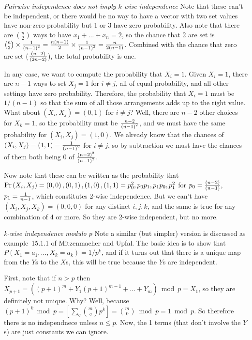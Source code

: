  {\it Pairwise independence does not imply $k$-wise independence}\hfil\break
Note that these can't be independent, or there would be no way to have a vector
with two set values have non-zero probability but 1 or 3 have zero probability.
Also note that there are $n \choose 2$ ways to have $x_1 + \ldots + x_n = 2$,
so the chance that 2 are set is ${n \choose 2} \times {1 \over \left(n - 1\right)^2} =
{n \left(n - 1\right) \over 2} \times {1 \over \left(n - 1\right)^2} = {n \over 2 \left(n - 1\right)}$.
Combined with the chance that zero are set ($\left(n - 2\right) \over \left(2 n - 2\right)$),
the total probability is one.

In any case, we want to compute the probability that $X_i = 1$.  Given $X_i = 1$, there are $n - 1$
ways to set $X_j = 1$ for $i \neq j$, all of equal probability, and all other settings have zero probability.
Therefore, the probability that $X_i = 1$ must be $1 / \left(n - 1\right)$ so that the sum of
all those arrangements adds up to the right value.  What about $\left(X_i, X_j\right) = \left(0, 1\right)$ 
for $i \neq j$? Well, there are $n-2$ other choices for $X_k = 1$, so the probability
must be $n - 2 \over \left(n - 1\right)^2$, and we must have the same probability
for $\left(X_i, X_j\right) = \left(1, 0\right)$.  We already know that the chances of
$\left(X_i, X_j\right) = \left(1, 1\right) = {1 \over \left(n - 1\right)^2}$ for $i \neq j$,
so by subtraction we must have the chances of them both being 0 of
$\left(n - 2\right)^2 \over \left(n - 1\right)^2$.

Now note that these can be written as the probability that ${\rm Pr} \left(X_i, X_j\right) = 
\left(0, 0\right), \left(0, 1\right), \left(1, 0\right), \left(1, 1\right) =
p_0^2, p_0 p_1, p_1 p_0, p_1^2$ for $p_0 = {\left( n - 2\right) \over \left(n - 1\right)}$,
$p_1 = {1 \over n - 1}$, which constitutes 2-wise independence.
But we can't have $\left(X_i, X_j, X_k\right) = \left(0, 0, 0\right)$ for any distinct
$i, j, k$, and the same is true for any combination of 4 or more.  So they are 2-wise
independent, but no more.

 {\it k-wise independence modulo $p$}\hfil\break
Note a similar (but simpler) version is discussed as example~15.1.1 of Mitzenmacher and Upfal.
The basic idea is to show that $P\left(X_1 = a_1, \dots, X_k = a_k\right) = 1 / p^k$, and if it turns
out that there is a unique map from the $Y$s to the $X$s, this will be true because the $Y$s are
independent.

First, note that if $n > p$ then $X_{p+1} = \left( \left(p+1\right)^m + Y_1 \left(p+1\right)^{m-1}
 + \ldots + Y_m\right) \bmod p =X_1$, so they are definitely not unique.  Why?  Well, because
 $\left(p + 1\right)^k \bmod p = \left[ \sum_q {m \choose q} p^k  \right] = {m \choose 0} \bmod p = 
 1 \bmod p$.  So therefore there is no independnece unless $n \leq p$.  Now, the 1 terms (that don't
 involve the $Y$s) are just constants we can ignore.

